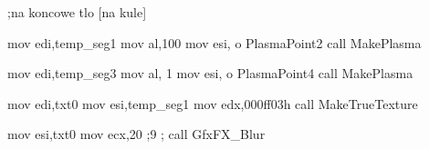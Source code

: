 ;na koncowe tlo [na kule]

	mov   edi,temp_seg1
	mov   al,100
	mov   esi, o PlasmaPoint2
	call  MakePlasma

	mov   edi,temp_seg3
	mov   al, 1
	mov   esi, o PlasmaPoint4
	call  MakePlasma


	mov   edi,txt0
	mov   esi,temp_seg1
	mov   edx,000ff03h
	call  MakeTrueTexture

	mov   esi,txt0
	mov   ecx,20 ;9
;	 call  GfxFX_Blur
